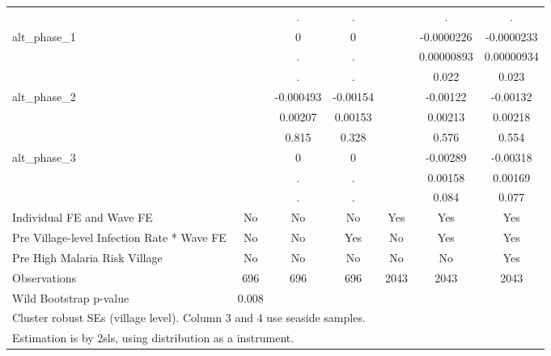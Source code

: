 {\begin{tabular}{l*{6}{c}}
                    &                     &           .         &           .         &                     &           .         &           .         \\
alt\_phase\_1         &                     &           0         &           0         &                     &  -0.0000226\sym{*}  &  -0.0000233\sym{*}  \\
                    &                     &           .         &           .         &                     &  0.00000893         &  0.00000934         \\
                    &                     &           .         &           .         &                     &       0.022         &       0.023         \\
alt\_phase\_2         &                     &   -0.000493         &    -0.00154         &                     &    -0.00122         &    -0.00132         \\
                    &                     &     0.00207         &     0.00153         &                     &     0.00213         &     0.00218         \\
                    &                     &       0.815         &       0.328         &                     &       0.576         &       0.554         \\
alt\_phase\_3         &                     &           0         &           0         &                     &    -0.00289\sym{+}  &    -0.00318\sym{+}  \\
                    &                     &           .         &           .         &                     &     0.00158         &     0.00169         \\
                    &                     &           .         &           .         &                     &       0.084         &       0.077         \\
Individual FE and Wave FE &          No         &          No         &          No         &         Yes         &         Yes         &         Yes         \\
Pre Village-level Infection Rate * Wave FE&          No         &          No         &         Yes         &          No         &         Yes         &         Yes         \\
Pre High Malaria Risk Village &          No         &          No         &          No         &          No         &          No         &         Yes         \\
\hline
Observations        &         696         &         696         &         696         &        2043         &        2043         &        2043         \\
Wild Bootstrap p-value &       0.008         &                     &                     &                     &                     &                     \\
\hline\hline
\multicolumn{7}{l}{\footnotesize Cluster robust SEs (village level). Column 3 and 4 use seaside samples.}\\
\multicolumn{7}{l}{\footnotesize Estimation is by 2sls, using distribution as a instrument.}\\
\end{tabular}
}
